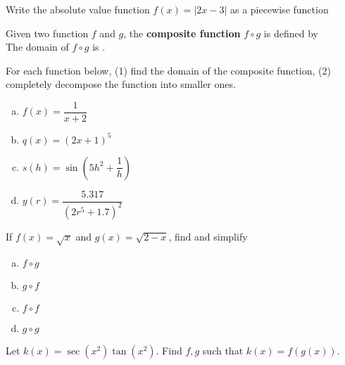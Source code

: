 \documentclass[notes]{subfiles}
\begin{document}
		\begin{ex}
			Write the absolute value function \(f(x) = |2x-3|\) as a piecewise function
		\end{ex}
			\newpage
			
		\begin{rmk}
			Given two function \(f\) and \(g\), the \textbf{composite function} \(f\circ g\) is defined by \\[20pt]
			The domain of \(f\circ g\) is .
		\end{rmk}
		
		\begin{ex}
			For each function below, (1) find the domain of the composite function, (2) completely decompose the function into smaller ones.
			\begin{enumerate}[(a)]
				\item \(f(x) = \dfrac{1}{x+2}\)

				\item  \(q(x) = (2x+1)^5\)	
						
				\item  \(s(h) = \sin \left(5h^2 + \dfrac{1}{h}\right)\)		
					
				\item  \(y(r) = \dfrac{5.317}{(2r^5 + 1.7)^2}\)		
			\end{enumerate}
		\end{ex}
			\newpage
			
		\begin{ex}
			If \(f(x) = \sqrt{x}\) and \(g(x) = \sqrt{2-x}\), find and simplify
				\begin{enumerate}[(a)]
					\item \(f\circ g\)
						\vs{1}
						
					\item \(g\circ f\)
						\vs{1}
						
					\item \(f\circ f\)
						\vs{1}
						
					\item \(g\circ g\)
						\vs{1}
				\end{enumerate}
		\end{ex}
			
		\begin{ex}
			Let \(k(x) = \sec(x^2)\tan(x^2)\).  Find \(f,g\) such that \(k(x) = f(g(x))\).
		\end{ex}
			\vs{1}
			\newpage
			
\end{document}
